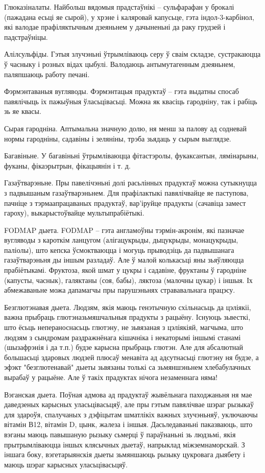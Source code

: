 Глюказіналаты.
Найбольш вядомыя прадстаўнікі – сульфарафан у брокалі (пажадана есьці яе сырой), у хрэне і каляровай капусьце, гэта індол-3-карбінол, які валодае прафіляктычным дзеяньнем у дачыненьні да раку грудзей і падстраўніцы.

Алілсульфіды.
Гэтыя злучэньні ўтрымліваюць серу ў сваім складзе, сустракаюцца ў часныку і розных відах цыбулі. Валодаюць антымутагенным дзеяньнем, паляпшаюць работу печані.

Фэрмэнтаваныя вугляводы.
Фэрмэнтацыя прадуктаў – гэта выдатны спосаб павялічыць іх пажыўныя ўласьцівасьці. Можна як квасіць гародніну, так і рабіць зь яе квасы.

Сырая гародніна.
Аптымальна значную долю, ня менш за палову ад содневай нормы гародніны, садавіны і зеляніны, трэба зьядаць у сырым выглядзе.

Багавіньне.
У багавіньні ўтрымліваюцца фітастэролы, фукаксантын, лямінарыны, фуканы, фікаэрытрын, фікацыянін і т. д.

Газаўтварэньне.
Пры павелічэньні долі расьлінных прадуктаў можна сутыкнуцца з падвышаным газаўтварэньнем. Для прафілактыкі павялічвайце яе паступова, пачніце з тэрмаапрацаваных прадуктаў, вар'іруйце прадукты (сачавіца замест гароху), выкарыстоўвайце мультыпрабіётыкі.

FODMAP дыета.
FODMAP – гэта англамоўны тэрмін-акронім, які пазначае вугляводы з кароткім ланцугом (алігацукрыды, дыцукрыды, монацукрыды, паліолы), што кепска ўсмоктваюцца і могуць прыводзіць да падвышанага газаўтварэньня ды іншым разладаў. Але ў малой колькасьці яны зьяўляюцца прабіётыкамі. Фруктоза, якой шмат у цукры і садавіне, фруктаны ў гародніне (капусты, часнык), галяктаны (соя, бабы), ляктоза (малочны цукар) і іншыя. Іх абмежаваньне можа дапамагчы пры парушэньнях стрававальнага працэсу.

Безглютэнавая дыета.
Людзям, якія маюць генэтычную схільнасьць да цэліякіі, важна прыбраць глютэназьмяшчальныя прадукты з рацыёну. Існуюць зьвесткі, што ёсьць непераноснасьць глютэну, не зьвязаная з цэліякіяй, магчыма, што людзям з сындромам раздражнёнага кішачніка і некаторымі іншымі станамі (шызафрэнія і да т.п.) будзе карысна прыбраць глютэн. Але для абсалютнай большасьці здаровых людзей плюсаў менавіта ад адсутнасьці глютэну ня будзе, а эфэкт "безглютенавай" дыеты зьвязаны толькі са зьмяншэньнем хлебабулачных вырабаў у рацыёне. Але ў такіх прадуктах нічога незаменнага няма!

Вэганская дыета.
Поўная адмова ад прадуктаў жывёльнага паходжаньня ня мае даведзеных карысных уласьцівасьцяў, але пры гэтым павялічвае шэраг рызыкаў для здароўя, спалучаных з дэфіцытам шматлікіх важных злучэньняў, уключаючы вітамін В12, вітамін D, цынк, жалеза і іншыя. Дасьледаваньні паказваюць, што вэганы маюць павышаную рызыку сьмерці ў параўнаньні зь людзьмі, якія прытрымліваюцца іншых клясычных дыетаў, напрыклад міжземнаморскай. З іншага боку, вэгетарыянскія дыеты зьмяншаюць рызыку цукровага дыябету і маюць шэраг карысных уласьцівасьцяў.

